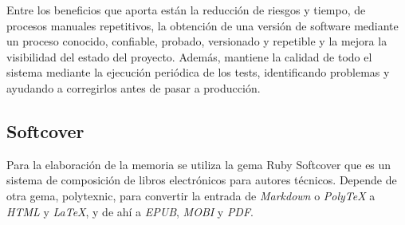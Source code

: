 Entre los beneficios que aporta están la reducción de riesgos y tiempo, de procesos manuales repetitivos, la obtención de una versión de software mediante un proceso conocido, confiable, probado, versionado y repetible y la mejora la visibilidad del estado del proyecto. Además, mantiene la calidad de todo el sistema mediante la ejecución periódica de los tests, identificando problemas y ayudando a corregirlos antes de pasar a producción.

\subsection{Softcover}

Para la elaboración de la memoria se utiliza la gema Ruby Softcover\cite{softcover} que es un sistema de composición de libros electrónicos para autores técnicos. Depende de otra gema, polytexnic, para convertir la entrada de \textit{Markdown} o \textit{PolyTeX} a \textit{HTML} y \textit{LaTeX}, y de ahí a \textit{EPUB}, \textit{MOBI} y \textit{PDF}.